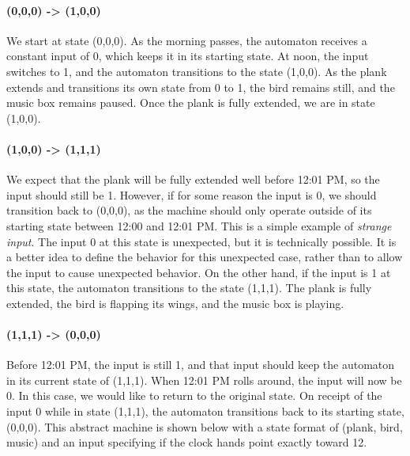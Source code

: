 \paragraph{(0,0,0) -> (1,0,0)} We start at state (0,0,0). As the morning passes, the automaton receives a constant input of 0, which keeps it in its starting state. At noon, the input switches to 1, and the automaton transitions to the state (1,0,0). As the plank extends and transitions its own state from 0 to 1, the bird remains still, and the music box remains paused. Once the plank is fully extended, we are in state (1,0,0).

\paragraph{(1,0,0) -> (1,1,1)} We expect that the plank will be fully extended well before 12:01 PM, so the input should still be 1. However, if for some reason the input is 0, we should transition back to (0,0,0), as the machine should only operate outside of its starting state between 12:00 and 12:01 PM. This is a simple example of \textit{strange input}. The input 0 at this state is unexpected, but it is technically possible. It is a better idea to define the behavior for this unexpected case, rather than to allow the input to cause unexpected behavior. On the other hand, if the input is 1 at this state, the automaton transitions to the state (1,1,1). The plank is fully extended, the bird is flapping its wings, and the music box is playing.

\paragraph{(1,1,1) -> (0,0,0)} Before 12:01 PM, the input is still 1, and that input should keep the automaton in its current state of (1,1,1). When 12:01 PM rolls around, the input will now be 0. In this case, we would like to return to the original state. On receipt of the input 0 while in state (1,1,1), the automaton transitions back to its starting state, (0,0,0). This abstract machine is shown below with a state format of (plank, bird, music) and an input specifying if the clock hands point exactly toward 12.

